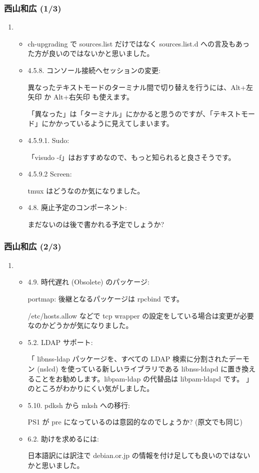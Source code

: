 \documentclass[cjk,dvipdfmx,10pt,compress,%
hyperref={bookmarks=true,bookmarksnumbered=true,bookmarksopen=false,%
colorlinks=false,%
pdftitle={第 71 回 関西 Debian 勉強会},%
pdfauthor={倉敷・のがた・佐々木・かわだ・八津尾},%
pdfsubject={資料},%
}]{beamer}
\begin{document}
\begin{frame}
  \frametitle{ 西山和広 (1/3)}
  \begin{enumerate}
  \item
    \begin{itemize}
    \item %
      ch-upgrading で sources.list だけではなく sources.list.d への言及もあった方が良いのではないかと思いました。
    \item %
      4.5.8. コンソール接続へセッションの変更:

        異なったテキストモードのターミナル間で切り替えを行うには、Alt+左矢印 か Alt+右矢印 も使えます。

      \noindent
      「異なった」は「ターミナル」にかかると思うのですが、「テキストモード」にかかっているように見えてしまいます。
    \item %
      4.5.9.1. Sudo:

      「visudo -f」はおすすめなので、もっと知られると良さそうです。
    \item %
      4.5.9.2 Screen:

      tmux はどうなのか気になりました。
    \item %
      4.8. 廃止予定のコンポーネント:

      まだないのは後で書かれる予定でしょうか?
    \end{itemize}
  \end{enumerate}
\end{frame}

\begin{frame}
  \frametitle{ 西山和広 (2/3)}
  \begin{enumerate}
  \item
    \begin{itemize}
    \item %
      4.9. 時代遅れ (Obsolete) のパッケージ:

        portmap: 後継となるパッケージは rpcbind です。

      \noindent
      /etc/hosts.allow などで tcp wrapper の設定をしている場合は変更が必要なのかどうかが気になりました。
    \item %
      5.2. LDAP サポート:

      「 libnss-ldap パッケージを、すべての LDAP 検索に分割されたデーモン (nslcd) を使っている新しいライブラリである libnss-ldapd に置き換えることをお勧めします。libpam-ldap の代替品は libpam-ldapd です。 」
      のところがわかりにくい気がしました。
    \item %
      5.10. pdksh から mksh への移行:

      PS1 が pre になっているのは意図的なのでしょうか? (原文でも同じ)
    \item %
      6.2. 助けを求めるには:

      日本語訳には訳注で debian.or.jp の情報を付け足しても良いのではないかと思いました。
    \end{itemize}
  \end{enumerate}
\end{frame}
\end{document}
